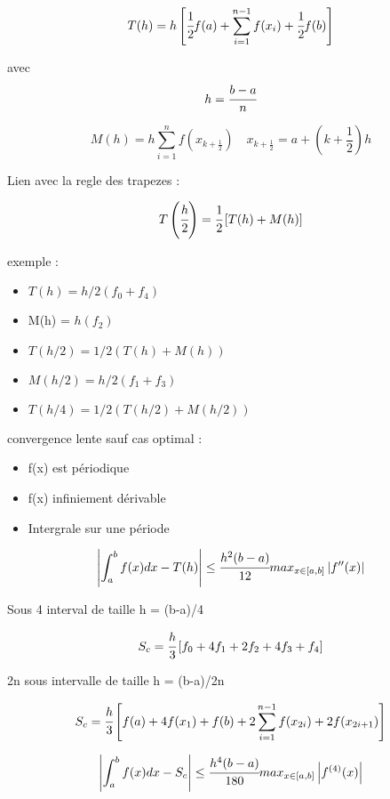 
$$T(h) = h\left[ \cfrac{1}{2} f(a) + \sum_{i=1}^{n-1} f(x_i) + \cfrac{1}{2} f(b) \right]$$

avec $$h = \cfrac{b-a}{n}$$



$$M(h) = h \sum_{i=1}^{n} f(x_{k+\frac{1}{2}}) \quad x_{k+\frac{1}{2}} = a + (k + \frac{1}{2})h$$

Lien avec la regle des trapezes : 

$$T\left(\cfrac{h}{2}\right) = \cfrac{1}{2} \left[T(h) + M(h)\right]$$

exemple : 

\begin{itemize}
    \item $T(h) = h/2 (f_0+f_4)$
    \item M(h) = $h(f_2)$
    \item $T(h/2) = 1/2 (T(h) + M(h))$
    \item $M(h/2) = h/2 (f_1+f_3)$
    \item $T(h/4) = 1/2 (T(h/2) + M(h/2))$
\end{itemize}

convergence lente sauf cas optimal :
\begin{itemize}
    \item f(x) est périodique
    \item f(x) infiniement dérivable
    \item Intergrale sur une période
\end{itemize}

$$\left\lvert \int_{a}^{b} f(x) dx - T(h) \right\rvert \leq \cfrac{h^2 (b-a)}{12} max_{x \in [a,b]} \left\lvert f''(x) \right\rvert$$

Sous 4 interval de taille h = (b-a)/4

$$S_c = \cfrac{h}{3} \left[ f_0 + 4f_1 + 2f_2 + 4f_3 + f_4 \right]$$

2n sous intervalle de taille h = (b-a)/2n

$$S_c = \cfrac{h}{3} \left[ f(a)+4f(x_1) + f(b) + 2 \sum_{i=1}^{n-1} f(x_{2i}) + 2f(x_{2i+1}) \right]$$ 


$$\left\lvert \int_{a}^{b} f(x) dx - S_c \right\rvert \leq \cfrac{h^4 (b-a)}{180} max_{x \in [a,b]} \left\lvert f^{(4)}(x) \right\rvert$$




